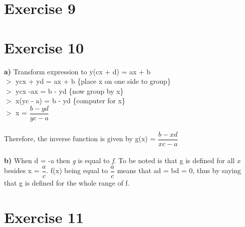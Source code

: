 \documentclass{article}
\begin{document}
  \section*{Exercise 9}
  \section*{Exercise 10}
  \textbf{a)} Transform expression to y(cx + d) = ax + b \\
  $>$ ycx + yd = ax + b \{place x on one side to group\} \\ 
  $>$ ycx -ax = b - yd  \{now group by x\} \\
  $>$ x(yc - a) = b - yd \{computer for x\} \\
  $>$ x = $\dfrac{b-yd}{yc-a}$ \\ \\
  Therefore, the inverse function is given by g(x) = $\dfrac{b-xd}{xc-a}$ \\ \\
  \textbf{b)} When d = -a then \textit{g} is equal to \textit{f}. To be noted is that g is defined for all \textit{x} besides x = $\dfrac{a}{c}$. f(x) being equal to $\dfrac{a}{c}$ means that ad = bd = 0, thus by saying that g is defined for the whole range of f.
   
  
  \section*{Exercise 11}
  
  
\end{document}
